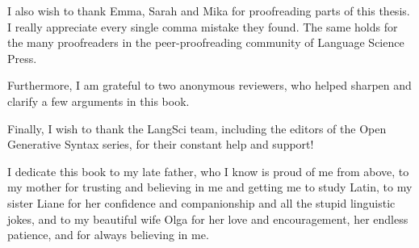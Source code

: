 I also wish to thank Emma, Sarah and Mika for proofreading parts of this thesis. I really appreciate every single comma mistake they found. The same holds for the many proofreaders in the peer-proofreading community of Language Science Press.

Furthermore, I am grateful to two anonymous reviewers, who helped sharpen and clarify a few arguments in this book.

Finally, I wish to thank the LangSci team, including the editors of the Open Generative Syntax series, for their constant help and support!

I dedicate this book to my late father, who I know is proud of me from above, to my mother for trusting and believing in me and getting me to study Latin, to my sister Liane for her confidence and companionship and all the stupid linguistic jokes, and to my beautiful wife Olga for her love and encouragement, her endless patience, and for always believing in me.


